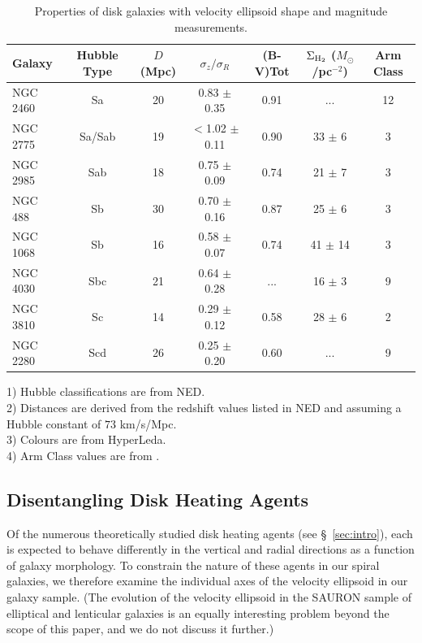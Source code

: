 \documentclass[useAMS,usenatbib]{mn2e}
\begin{document}
\begin{table}
  \begin{center}
    \caption{Properties of disk galaxies with velocity ellipsoid shape
      and magnitude measurements.}
    \begin{tabular}{@{}lcccccc@{}}
    \hline
    Galaxy & Hubble Type & $D$ (Mpc) & $\sigma_z/\sigma_R$ & (B-V)Tot & $\Sigma_{\rm{H_2}}$ ($M_\odot$/pc$^{-2}$) & Arm Class \\
    \hline
    NGC 2460  &  Sa      & 20 &    0.83 $\pm$ 0.35 &  0.91  & ...         & 12 \\
    NGC 2775  &  Sa/Sab  & 19 & $<$1.02 $\pm$ 0.11 &  0.90  & 33 $\pm$ 6  & 3  \\
    NGC 2985  &  Sab     & 18 &    0.75 $\pm$ 0.09 &  0.74  & 21 $\pm$ 7  & 3  \\
    NGC 488   &  Sb      & 30 &    0.70 $\pm$ 0.16 &  0.87  & 25 $\pm$ 6  & 3  \\
    NGC 1068  &  Sb      & 16 &    0.58 $\pm$ 0.07 &  0.74  & 41 $\pm$ 14 & 3  \\
    NGC 4030  &  Sbc     & 21 &    0.64 $\pm$ 0.28 &  ...   & 16 $\pm$ 3  & 9  \\
    NGC 3810  &  Sc      & 14 &    0.29 $\pm$ 0.12 &  0.58  & 28 $\pm$ 6  & 2  \\
    NGC 2280  &  Scd     & 26 &    0.25 $\pm$ 0.20 &  0.60  & ...         & 9  \\
    \hline
    \end{tabular}
    \label{t:samplepar}
    \end{center}
\vspace{-0.25cm}
\begin{flushleft}
1) Hubble classifications are from NED. \\
2) Distances are derived from the redshift values listed in NED and assuming a
Hubble constant of $73$ km/s/Mpc. \\
3) Colours are from HyperLeda. \\
4) Arm Class values are from \citet{Elmegreen1987}.
\end{flushleft}

\end{table}


\subsection{Disentangling Disk Heating Agents}
\label{s:agents}

Of the numerous theoretically studied disk heating agents (see
\S~\ref{sec:intro}), each is expected to behave differently in the
vertical and radial directions as a function of galaxy morphology.  To
constrain the nature of these agents in our spiral galaxies, we
therefore examine the individual axes of the velocity ellipsoid in our
galaxy sample.  (The evolution of the velocity ellipsoid in the SAURON
sample of elliptical and lenticular galaxies is an equally interesting
problem beyond the scope of this paper, and we do not discuss it
further.)
\end{document}
